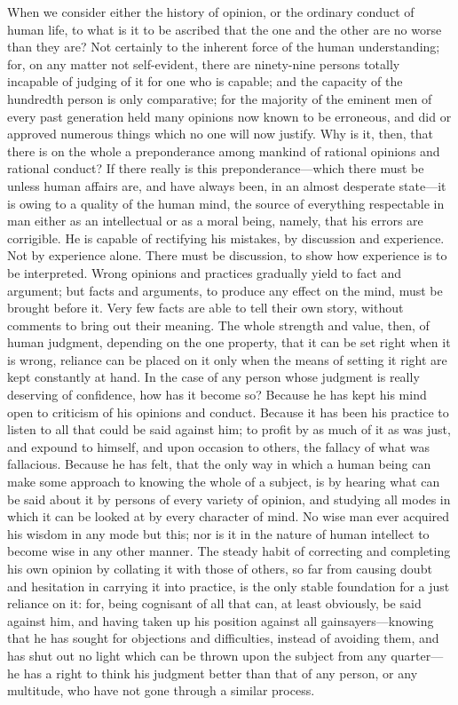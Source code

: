 \documentclass[11pt,openany]{book}
\begin{document}
When we consider either the history of opinion, or the ordinary conduct of human life, to what is it to be ascribed that the one and the other are no worse than they are? Not certainly to the inherent force of the human understanding; for, on any matter not self-evident, there are ninety-nine persons totally incapable of judging of it for one who is capable; and the capacity of the hundredth person is only comparative; for the majority of the eminent men of every past generation held many opinions now known to be erroneous, and did or approved numerous things which no one will now justify. Why is it, then, that there is on the whole a preponderance among mankind of rational opinions and rational conduct? If there really is this preponderance---which there must be unless human affairs are, and have always been, in an almost desperate state---it is owing to a quality of the human mind, the source of everything respectable in man either as an intellectual or as a moral being, namely, that his errors are corrigible. He is capable of rectifying his mistakes, by discussion and experience. Not by experience alone. There must be discussion, to show how experience is to be interpreted. Wrong opinions and practices gradually yield to fact and argument; but facts and arguments, to produce any effect on the mind, must be brought before it. Very few facts are able to tell their own story, without comments to bring out their meaning. The whole strength and value, then, of human judgment, depending on the one property, that it can be set right when it is wrong, reliance can be placed on it only when the means of setting it right are kept constantly at hand. In the case of any person whose judgment is really deserving of confidence, how has it become so? Because he has kept his mind open to criticism of his opinions and conduct. Because it has been his practice to listen to all that could be said against him; to profit by as much of it as was just, and expound to himself, and upon occasion to others, the fallacy of what was fallacious. Because he has felt, that the only way in which a human being can make some approach to knowing the whole of a subject, is by hearing what can be said about it by persons of every variety of opinion, and studying all modes in which it can be looked at by every character of mind. No wise man ever acquired his wisdom in any mode but this; nor is it in the nature of human intellect to become wise in any other manner. The steady habit of correcting and completing his own opinion by collating it with those of others, so far from causing doubt and hesitation in carrying it into practice, is the only stable foundation for a just reliance on it: for, being cognisant of all that can, at least obviously, be said against him, and having taken up his position against all gainsayers---knowing that he has sought for objections and difficulties, instead of avoiding them, and has shut out no light which can be thrown upon the subject from any quarter---he has a right to think his judgment better than that of any person, or any multitude, who have not gone through a similar process.
\end{document}
